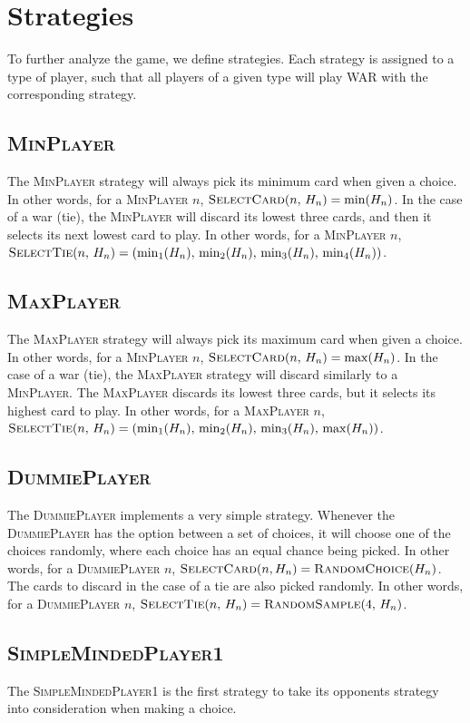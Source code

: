 \documentclass[conference]{IEEEtran}
\newcommand\MinP{\textsc{MinPlayer}}
\newcommand\MaxP{\textsc{MaxPlayer}}
\newcommand\DP{\textsc{DummiePlayer}}
\newcommand\SMPo{\textsc{SimpleMindedPlayer1}}
\begin{document}
\section{Strategies}
To further analyze the game, we define strategies. Each strategy is assigned
to a type of player, such that all players of a given type will play WAR with
the corresponding strategy.

\subsection{\MinP}
The \MinP{} strategy will always pick its minimum card when
given a choice. In other words, for a \MinP{} $n$, $\textsc{SelectCard}(n,\,H_n) = \min(H_n)$.
In the case of a war (tie), the \MinP{} will discard
its lowest three cards, and then it selects its next lowest card to play.
In other words, for a \MinP{} $n$, $\textsc{SelectTie}(n,\,H_n) = (\min_1(H_n),\,\min_2(H_n),\,\min_3(H_n),\,\min_4(H_n))$.


\subsection{\MaxP}
The \MaxP{} strategy will always pick its maximum card when
given a choice. In other words, for a \MinP{} $n$, $\textsc{SelectCard}(n,\,H_n) = \max(H_n)$.
In the case of a war (tie), the \MaxP{} strategy will discard
similarly to a \MinP. The \MaxP{} discards its lowest three cards,
but it selects its highest card to play.
In other words, for a \MaxP{} $n$, $\textsc{SelectTie}(n,\,H_n) = (\min_1(H_n),\,\min_2(H_n),\,\min_3(H_n),\,\max(H_n))$.

\subsection{\DP}
The \DP{} implements a very simple strategy. Whenever the \DP{}
has the option between a set of choices, it will choose one of the choices
randomly, where each choice has an equal chance being picked. In other words,
for a \DP{} $n$, $\textsc{SelectCard}(n, H_n) = \textsc{RandomChoice}(H_n)$.
The cards to discard in the case of a tie are also picked randomly.
In other words, for a \DP{} $n$, $\textsc{SelectTie}(n,\,H_n) = \textsc{RandomSample}(4,\,H_n)$.


\subsection{\SMPo}
The \SMPo{} is the first strategy to take its opponents strategy into consideration when making a choice.
\end{document}
